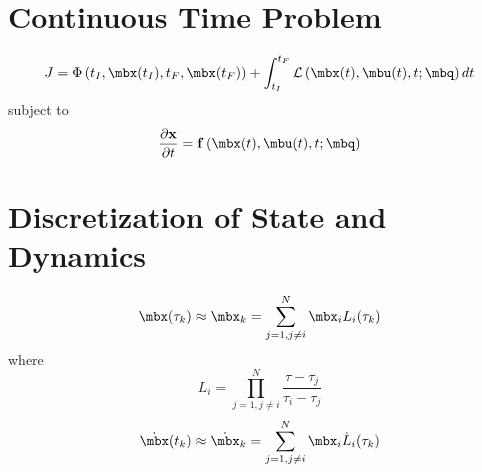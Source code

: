 \section{Continuous Time Problem}

\begin{equation}
     J = \Phi \left(t_I,\mbx(t_I),t_F,\mbx(t_F)\right) + \int_{t_I}^{t_F} \mathcal{L}\left( \mbx(t),\mbu(t),t;\mbq \right)dt
\end{equation}
%
subject to
%
\begin{equation}
   \frac{\partial \mathbf{x}}{\partial t} = \mathbf{f}\left( \mbx(t),\mbu(t),t;\mbq \right)
\end{equation}

\section{Discretization of State and Dynamics}

\begin{equation}
    \mbx(\tau_k) \approx \mbx_k =  \sum^{N}_{j = 1,j \neq i} \mbx_i L_i(\tau_k)
\end{equation}
%
where
%
\begin{equation}
    L_i = \prod^{N}_{j = 1,j \neq i} \frac{\tau - \tau_j}{\tau_i - \tau_j}
\end{equation}
%
%
\begin{equation}
   \dot{\mbx}(t_k) \approx \dot{\mbx}_k =  \sum^{N}_{j = 1,j \neq i} \mbx_i \dot{L}_i(\tau_k)  
\end{equation}

